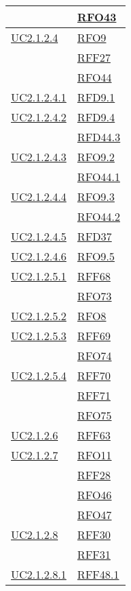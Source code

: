 \begin{longtable}{|>{\centering}m{5cm}|m{5cm}<{\centering}|}
	& \hyperlink{RFO43}{RFO43}\\ \hline
	\hyperref[UC2.1.2.4]{UC2.1.2.4} & \hyperlink{RFO9}{RFO9}\\
	& \hyperlink{RFF27}{RFF27}\\
	& \hyperlink{RFO44}{RFO44}\\ \hline
	\hyperref[UC2.1.2.4.1]{UC2.1.2.4.1} & \hyperlink{RFD9.1}{RFD9.1}\\ \hline
	\hyperref[UC2.1.2.4.2]{UC2.1.2.4.2} & \hyperlink{RFD9.4}{RFD9.4}\\
	& \hyperlink{RFD44.3}{RFD44.3}\\ \hline
	\hyperref[UC2.1.2.4.3]{UC2.1.2.4.3} & \hyperlink{RFO9.2}{RFO9.2}\\
	& \hyperlink{RFO44.1}{RFO44.1}\\ \hline
	\hyperref[UC2.1.2.4.4]{UC2.1.2.4.4} & \hyperlink{RFO9.3}{RFO9.3}\\
	& \hyperlink{RFO44.2}{RFO44.2}\\ \hline
	\hyperref[UC2.1.2.4.5]{UC2.1.2.4.5} & \hyperlink{RFD37}{RFD37}\\ \hline
	\hyperref[UC2.1.2.4.6]{UC2.1.2.4.6} & \hyperlink{RFO9.5}{RFO9.5}\\ \hline
	\hyperref[UC2.1.2.5.1]{UC2.1.2.5.1} & \hyperlink{RFF68}{RFF68}\\
	& \hyperlink{RFO73}{RFO73}\\ \hline
	\hyperref[UC2.1.2.5.2]{UC2.1.2.5.2} & \hyperlink{RFO8}{RFO8}\\ \hline
	\hyperref[UC2.1.2.5.3]{UC2.1.2.5.3} & \hyperlink{RFF69}{RFF69}\\
	& \hyperlink{RFO74}{RFO74}\\ \hline
	\hyperref[UC2.1.2.5.4]{UC2.1.2.5.4} & \hyperlink{RFF70}{RFF70}\\
	& \hyperlink{RFF71}{RFF71}\\
	& \hyperlink{RFO75}{RFO75}\\ \hline
	\hyperref[UC2.1.2.6]{UC2.1.2.6} & \hyperlink{RFF63}{RFF63}\\ \hline
	\hyperref[UC2.1.2.7]{UC2.1.2.7} & \hyperlink{RFO11}{RFO11}\\
	& \hyperlink{RFF28}{RFF28}\\
	& \hyperlink{RFO46}{RFO46}\\
	& \hyperlink{RFO47}{RFO47}\\ \hline
	\hyperref[UC2.1.2.8]{UC2.1.2.8} & \hyperlink{RFF30}{RFF30}\\
	& \hyperlink{RFF31}{RFF31}\\ \hline
	\hyperref[UC2.1.2.8.1]{UC2.1.2.8.1} & \hyperlink{RFF48.1}{RFF48.1}\\

\end{longtable}
